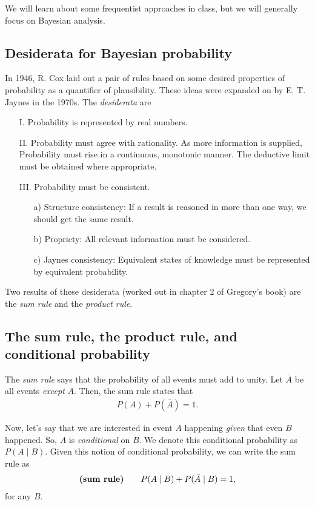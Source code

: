 We will learn about some frequentist approaches in class, but we will
generally focus on Bayesian analysis.

\subsection{Desiderata for Bayesian probability}
In 1946, R. Cox laid out a pair of rules based on some desired
properties of probability as a quantifier of plausibility.  These ideas
were expanded on by E. T. Jaynes in the 1970s.  The
\textit{desiderata} are
\begin{itemize}
\item[I.] Probability is represented by real numbers.
\item[II.] Probability must agree with rationality.  As more
  information is supplied, Probability must rise in a continuous,
  monotonic manner.  The deductive limit must be obtained where
  appropriate.
\item[III.] Probability must be consistent.
  \begin{enumerate}
  \item[a)] Structure consistency: If a result is reasoned in more
    than one way, we should get the same result.
  \item[b)] Propriety: All relevant information must be considered.
  \item[c)] Jaynes consistency: Equivalent states of knowledge must be
    represented by equivalent probability.
  \end{enumerate}
\end{itemize}

Two results of these desiderata (worked out in chapter 2 of Gregory's
book) are the \textit{sum rule} and the \textit{product rule}.

\subsection{The sum rule, the product rule, and conditional probability}
The \textit{sum rule} says that the probability of all events must add
to unity.  Let $\bar{A}$ be all events \textit{except} $A$.  Then, the
sum rule states that
\begin{align}
  P(A) + P(\bar{A}) = 1.
\end{align}

Now, let's say that we are interested in event $A$ happening
\textit{given} that even $B$ happened.  So, $A$ is
\textit{conditional} on $B$.  We denote this conditional probability
as $P(A\mid B)$.  Given this notion of conditional probability, we can
write the sum rule as
\begin{align}
  \text{\textbf{(sum rule)}} \qquad P(A\mid B) + P(\bar{A} \mid B) = 1,
\end{align}
for any $B$.

